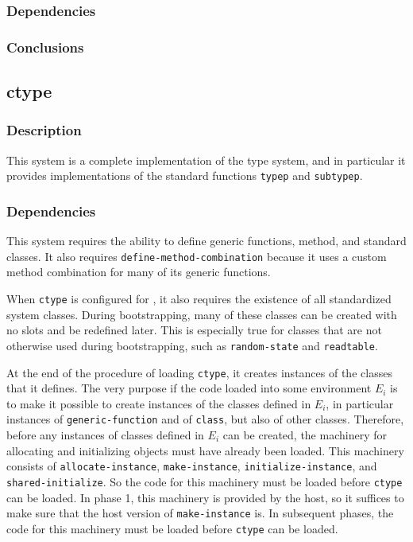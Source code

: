 \subsubsection{Dependencies}

\subsubsection{Conclusions}

\subsection{ctype}
\label{sec-subtype}

\subsubsection{Description}

This system is a complete implementation of the \commonlisp{} type
system, and in particular it provides implementations of the standard
functions \texttt{typep} and \texttt{subtypep}.

\subsubsection{Dependencies}

This system requires the ability to define generic functions, method,
and standard classes.  It also requires
\texttt{define-method-combination} because it uses a custom method
combination for many of its generic functions.

When \texttt{ctype} is configured for \sysname{}, it also requires the
existence of all standardized system classes.  During bootstrapping,
many of these classes can be created with no slots and be redefined
later.  This is especially true for classes that are not otherwise
used during bootstrapping, such as \texttt{random-state} and
\texttt{readtable}.

At the end of the procedure of loading \texttt{ctype}, it creates
instances of the classes that it defines.  The very purpose if the
code loaded into some environment $E_i$ is to make it possible to
create instances of the classes defined in $E_i$, in particular
instances of \texttt{generic-function} and of \texttt{class}, but also
of other classes.  Therefore, before any instances of classes defined
in $E_i$ can be created, the machinery for allocating and initializing
objects must have already been loaded.  This machinery consists of
\texttt{allocate-instance}, \texttt{make-instance},
\texttt{initialize-instance}, and \texttt{shared-initialize}.  So the
code for this machinery must be loaded before \texttt{ctype} can be
loaded.  In phase 1, this machinery is provided by the host, so it
suffices to make sure that the host version of \texttt{make-instance}
is.  In subsequent phases, the code for this machinery must be loaded
before \texttt{ctype} can be loaded.

